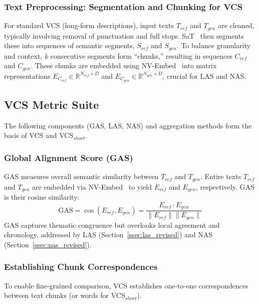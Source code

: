 \documentclass[letterpaper]{article} %
\begin{document}
\subsubsection{Text Preprocessing: Segmentation and Chunking for VCS}
\label{sssec:text_preprocessing_and_chunking_revised}
For standard VCS (long-form descriptions), input texts $T_{ref}$ and $T_{gen}$ are cleaned, typically involving removal of punctuation and full stops. SaT~\cite{frohmann2024segment} then segments these into sequences of semantic segments, $S_{ref}$ and $S_{gen}$. To balance granularity and context, $k$ consecutive segments form ``chunks,'' resulting in sequences $C_{ref}$ and $C_{gen}$. These chunks are embedded using NV-Embed~\cite{lee2024nv} into matrix representations $E_{C_{ref}} \in \mathbb{R}^{N_{ref} \times D}$ and $E_{C_{gen}} \in \mathbb{R}^{N_{gen} \times D}$, crucial for LAS and NAS.

\subsection{VCS Metric Suite}
\label{sec:vcs_metric_suite_revised}
The following components (GAS, LAS, NAS) and aggregation methods form the basis of VCS and VCS$_{short}$.

\subsubsection{Global Alignment Score (GAS)}
\label{ssec:gas_revised}
GAS measures overall semantic similarity between $T_{ref}$ and $T_{gen}$. Entire texts $T_{ref}$ and $T_{gen}$ are embedded via NV-Embed~\cite{lee2024nv} to yield $E_{ref}$ and $E_{gen}$, respectively. GAS is their cosine similarity:
\begin{equation}
\label{eq:gas_revised}
\text{GAS} = \cos(E_{ref}, E_{gen}) = \frac{E_{ref} \cdot E_{gen}}{\|E_{ref}\| \|E_{gen}\|}
\end{equation}
GAS captures thematic congruence but overlooks local agreement and chronology, addressed by LAS (Section~\ref{ssec:las_revised}) and NAS (Section~\ref{ssec:nas_revised}).

\subsubsection{Establishing Chunk Correspondences}
\label{ssec:chunk_correspondences_revised}
To enable fine-grained comparison, VCS establishes one-to-one correspondences between text chunks (or words for VCS$_{short}$).
\end{document}
